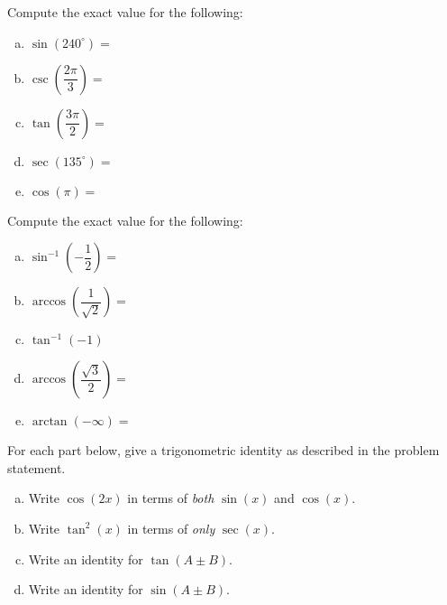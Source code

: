 \documentclass[12pt,letterpaper]{exam}
\begin{document}
\examtitle
{} 
\scores
\bottomline
\newpage


\begin{questions}

\newpage
\question[15] Compute the exact value for the following: \par\vspace{0.3cm}
	\begin{enumerate}[(a)]
	\item $\sin(240^\circ)=$ \vfill
	\item $\csc \!\left( \dfrac{2\pi}{3} \right)=$ \vfill
	\item $\tan \!\left(\dfrac{3 \pi}{2} \right)=$ \vfill
	\item $\sec(135^\circ)=$ \vfill
	\item $\cos(\pi)=$ \vfill
	\end{enumerate}



\newpage
\question[15] Compute the exact value for the following: \par\vspace{0.3cm}
	\begin{enumerate}[(a)]
	\item $\sin^{-1} \!\!\left( -\dfrac{1}{2} \right)=$ \vfill
	\item $\arccos \!\left( \dfrac{1}{\sqrt{2}} \right)=$ \vfill
	\item $\tan^{-1}(-1)$ \vfill
	\item $\arccos \!\left( \dfrac{\sqrt{3}}{2} \right)=$ \vfill
	\item $\arctan(-\infty)=$ \vfill
	\end{enumerate}



\newpage
\question[10] For each part below, give a trigonometric identity as described in the problem statement.
	\begin{enumerate}[(a)]
	\item Write $\cos(2x)$ in terms of \textit{both} $\sin(x)$ and $\cos(x)$. \vfill
	\item Write $\tan^2(x)$ in terms of \textit{only} $\sec(x)$. \vfill
	\item Write an identity for $\tan(A \pm B)$. \vfill
	\item Write an identity for $\sin(A \pm B)$. \vfill
	\end{enumerate}




\end{questions}
\end{document}

